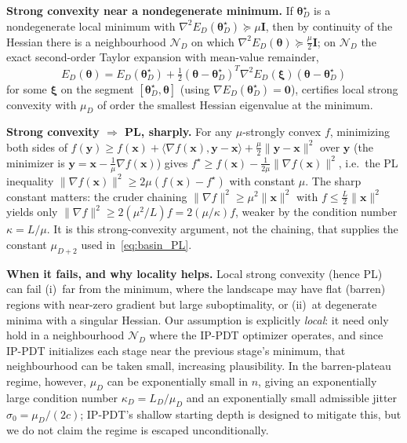 \documentclass[11pt]{article}
\newcommand{\cN}{\mathcal{N}}
\theoremstyle{plain}
\theoremstyle{plain}
\begin{document}
\medskip\noindent\textbf{Strong convexity near a nondegenerate minimum.}
If $\bm\theta_D^\star$ is a nondegenerate local minimum with
$\nabla^2 E_D(\bm\theta_D^\star)\succeq\mu \mathbf{I}$, then by continuity of
the Hessian there is a neighbourhood $\cN_D$ on which
$\nabla^2 E_D(\bm\theta)\succeq\tfrac{\mu}{2}\mathbf{I}$; on $\cN_D$ the exact
second-order Taylor expansion with mean-value remainder,
\[
  E_D(\bm\theta)= E_D(\bm\theta_D^\star)
  +\tfrac{1}{2}(\bm\theta-\bm\theta_D^\star)^T
  \nabla^2 E_D(\bm\xi) (\bm\theta-\bm\theta_D^\star)
\]
for some $\bm\xi$ on the segment $[\bm\theta_D^\star,\bm\theta]$ (using
$\nabla E_D(\bm\theta_D^\star)=\bm 0$), certifies local strong convexity
with $\mu_D$ of order the smallest Hessian eigenvalue at the minimum.

\medskip\noindent\textbf{Strong convexity $\Rightarrow$ PL, sharply.}
For any $\mu$-strongly convex $f$, minimizing both sides of
$f(\bm y)\ge f(\bm x)+\langle\nabla f(\bm x),\bm y-\bm x\rangle
+\tfrac{\mu}{2}\|\bm y-\bm x\|^2$ over $\bm y$ (the minimizer is
$\bm y=\bm x-\tfrac1\mu\nabla f(\bm x)$) gives
$f^\star\ge f(\bm x)-\tfrac{1}{2\mu}\|\nabla f(\bm x)\|^2$, i.e.\ the PL
inequality $\|\nabla f(\bm x)\|^2\ge 2\mu (f(\bm x)-f^\star)$ with
constant $\mu$.  The sharp constant matters: the cruder chaining
$\|\nabla f\|^2\ge\mu^2\|\bm x\|^2$ with $f\le\tfrac{L}{2}\|\bm x\|^2$
yields only $\|\nabla f\|^2\ge 2(\mu^2/L)f=2(\mu/\kappa)f$, weaker by the
condition number $\kappa=L/\mu$.  It is this strong-convexity argument,
not the chaining, that supplies the constant $\mu_{D+2}$ used
in~\eqref{eq:basin_PL}.

\medskip\noindent\textbf{When it fails, and why locality helps.}
Local strong convexity (hence PL) can fail (i)~far from the minimum,
where the landscape may have flat (barren) regions with near-zero
gradient but large suboptimality, or (ii)~at degenerate minima with a
singular Hessian.  Our assumption is explicitly \emph{local}: it need
only hold in a neighbourhood $\cN_D$ where the IP-PDT optimizer
operates, and since IP-PDT initializes each stage near the previous
stage's minimum, that neighbourhood can be taken small, increasing
plausibility.  In the barren-plateau regime, however, $\mu_D$ can be
exponentially small in $n$, giving an exponentially large condition
number $\kappa_D=L_D/\mu_D$ and an exponentially small admissible jitter
$\sigma_0=\mu_D/(2c)$; IP-PDT's shallow starting depth is designed to
mitigate this, but we do not claim the regime is escaped
unconditionally.
\end{document}
